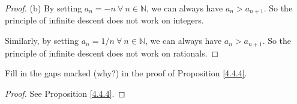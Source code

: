 \begin{proof}{(b)}
By setting \(a_n = -n \ \forall\ n \in \mathds{N}\), we can always have \(a_n > a_{n + 1}\).
So the principle of infinite descent does not work on integers.

Similarly, by setting \(a_n = 1 / n \ \forall\ n \in \mathds{N}\), we can always have \(a_n > a_{n + 1}\).
So the principle of infinite descent does not work on rationals.
\end{proof}

\begin{exercise}\label{ex 4.4.3}
Fill in the gaps marked (why?) in the proof of Proposition \ref{4.4.4}.
\end{exercise}

\begin{proof}
See Proposition \ref{4.4.4}.
\end{proof}